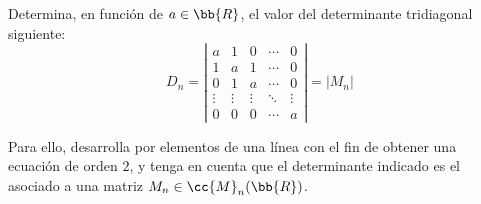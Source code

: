 \begin{ejercicio}
    Determina, en función de $a\in \bb{R}$, el valor del determinante tridiagonal siguiente:
    \begin{equation*}
        D_n = \left|
            \begin{array}{ccccc}
                a & 1 & 0 & \cdots & 0\\
                1 & a & 1 & \cdots & 0\\
                0 & 1 & a & \cdots & 0\\
                \vdots & \vdots & \vdots & \ddots & \vdots\\
                0 & 0 & 0 & \cdots & a
            \end{array}
        \right| = |M_n|
    \end{equation*}

    Para ello, desarrolla por elementos de una línea con el fin de obtener una ecuación de orden $2$, y tenga en cuenta que el determinante indicado es el asociado a una matriz $M_n\in \cc{M}_n(\bb{R})$.\\


\end{ejercicio}
